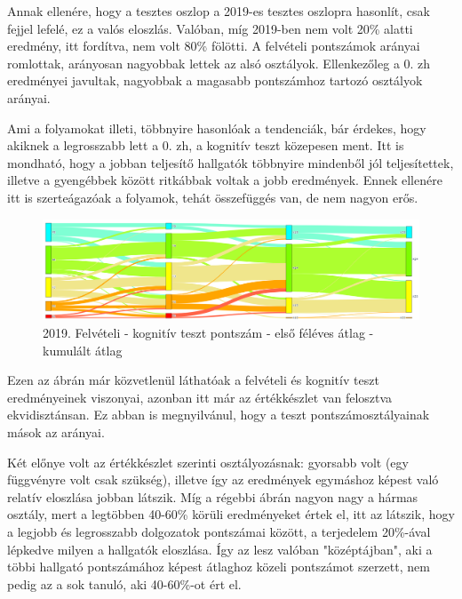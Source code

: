 \documentclass[12pt]{article}
\begin{document}
Annak ellenére, hogy a tesztes oszlop a 2019-es tesztes oszlopra hasonlít, csak fejjel lefelé, ez a valós eloszlás. Valóban, míg 2019-ben nem volt 20\% alatti eredmény, itt fordítva, nem volt 80\% fölötti. A felvételi pontszámok arányai romlottak, arányosan nagyobbak lettek az alsó osztályok. Ellenkezőleg a 0. zh eredményei javultak, nagyobbak a magasabb pontszámhoz tartozó osztályok arányai. 

Ami a folyamokat illeti, többnyire hasonlóak a tendenciák, bár érdekes, hogy akiknek a legrosszabb lett a 0. zh, a kognitív teszt közepesen ment. Itt is mondható, hogy a jobban teljesítő hallgatók többnyire mindenből jól teljesítettek, illetve a gyengébbek között ritkábbak voltak a jobb eredmények. Ennek ellenére itt is szerteágazóak a folyamok, tehát összefüggés van, de nem nagyon erős.


\begin{figure}[H]
\centering
\includegraphics[scale=0.6]{kepek/2019_felvi_teszt_atlag_kumatlag.png}
\caption{2019. Felvételi - kognitív teszt pontszám - első féléves átlag - kumulált átlag}
\label{fig:2019_felvi_teszt_atlag_kumatlag}
\end{figure}

Ezen az ábrán már közvetlenül láthatóak a felvételi és kognitív teszt eredményeinek viszonyai, azonban itt már az értékkészlet van felosztva ekvidisztánsan. Ez abban is megnyilvánul, hogy a teszt pontszámosztályainak mások az arányai. 

Két előnye volt az értékkészlet szerinti osztályozásnak: gyorsabb volt (egy függvényre volt csak szükség), illetve így az eredmények egymáshoz képest való relatív eloszlása jobban látszik. Míg a régebbi ábrán nagyon nagy a hármas osztály, mert a legtöbben 40-60\% körüli eredményeket értek el, itt az látszik, hogy a legjobb és legrosszabb dolgozatok pontszámai között, a terjedelem 20\%-ával lépkedve milyen a hallgatók eloszlása. Így az lesz valóban "középtájban", aki a többi hallgató pontszámához képest átlaghoz közeli pontszámot szerzett, nem pedig az a sok tanuló, aki 40-60\%-ot ért el.
\end{document}
